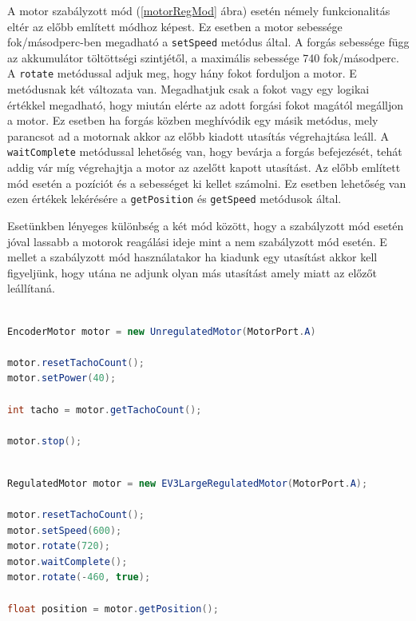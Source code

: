 A motor szabályzott mód (\ref{motorRegMod} ábra) esetén némely funkcionalitás eltér az előbb említett módhoz képest. Ez esetben a motor sebessége fok/másodperc-ben megadható a \texttt{setSpeed} metódus által. A forgás sebessége függ az akkumulátor töltöttségi szintjétől, a maximális sebessége 740 fok/másodperc. A \texttt{rotate} metódussal adjuk meg, hogy hány fokot forduljon a motor. E metódusnak két változata van. Megadhatjuk csak a fokot vagy egy logikai értékkel megadható, hogy miután elérte az adott forgási fokot magától megálljon a motor. Ez esetben ha forgás közben meghívódik egy másik metódus, mely parancsot ad a motornak akkor az előbb kiadott utasítás végrehajtása leáll. A \texttt{waitComplete} metódussal lehetőség van, hogy bevárja a forgás befejezését, tehát addig vár míg végrehajtja a motor az azelőtt kapott utasítást. Az előbb említett mód esetén a pozíciót és a sebességet ki kellet számolni. Ez esetben lehetőség van ezen értékek lekérésére a \texttt{getPosition} és \texttt{getSpeed} metódusok által.

Esetünkben lényeges különbség a két mód között, hogy a szabályzott mód esetén jóval lassabb a motorok reagálási ideje mint a nem szabályzott mód esetén. E mellet a szabályzott mód használatakor ha kiadunk egy utasítást akkor kell figyeljünk, hogy utána ne adjunk olyan más utasítást amely miatt az előzőt leállítaná.

\begin{lstlisting}[label=motorUnregMod, caption=  A nagy motor \texttt{unregulated} mód használata, language=Java]

EncoderMotor motor = new UnregulatedMotor(MotorPort.A)

motor.resetTachoCount();
motor.setPower(40);

int tacho = motor.getTachoCount();

motor.stop();

\end{lstlisting}

\begin{lstlisting}[label=motorRegMod, caption= A nagy motor \texttt{regulated} mód használata, language=Java]

RegulatedMotor motor = new EV3LargeRegulatedMotor(MotorPort.A);

motor.resetTachoCount();
motor.setSpeed(600);
motor.rotate(720);
motor.waitComplete();
motor.rotate(-460, true);

float position = motor.getPosition();

\end{lstlisting}

